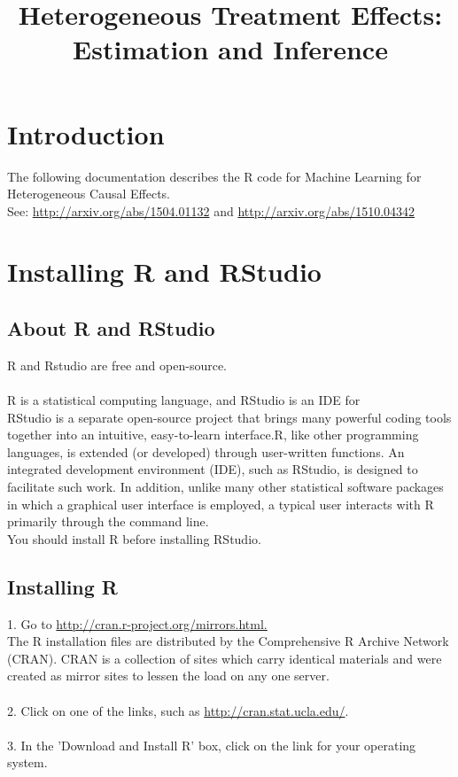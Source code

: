 \documentclass{article}
\title{Heterogeneous Treatment Effects: Estimation and Inference}
\begin{document}
\maketitle
\tableofcontents
\newpage
\section{Introduction}
The following documentation describes the R code for Machine Learning for Heterogeneous Causal Effects. \\
See: \url{http://arxiv.org/abs/1504.01132} and \url{http://arxiv.org/abs/1510.04342}

\section{Installing R and RStudio}

\subsection{About R and RStudio}
R and Rstudio are free and open-source. \\ \\
R is a statistical computing language, and RStudio is an IDE for \\
RStudio is a separate open-source project that brings many powerful coding tools together into an intuitive, easy-to-learn interface.R, like other programming languages, is extended (or developed) through user-written functions. An integrated development environment (IDE), such as RStudio, is designed to facilitate such work. In addition, unlike many other statistical software packages in which a graphical user interface is employed, a typical user interacts with R primarily through the command line.\\

You should install R before installing RStudio.

\subsection{Installing R}
1. Go to \url{http://cran.r-project.org/mirrors.html.} \\ 
The R installation files are distributed by the Comprehensive R Archive Network (CRAN). CRAN is a
collection of sites which carry identical materials and were created as mirror sites to lessen the load on
any one server. \\ \\
2. Click on one of the links, such as \url{http://cran.stat.ucla.edu/}. \\ \\
3. In the 'Download and Install R' box, click on the link for your operating system. \\ \\
\end{document}
